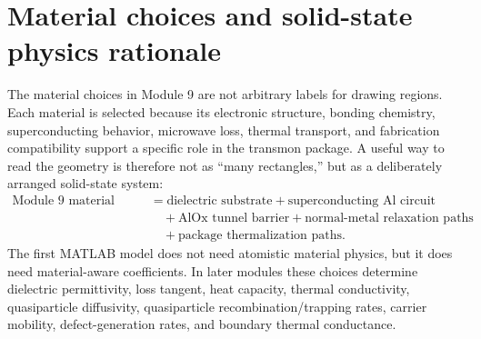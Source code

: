 \documentclass[11pt]{article}
\begin{document}
\section{Material choices and solid-state physics rationale}
The material choices in Module 9 are not arbitrary labels for drawing regions. Each material is selected because its electronic structure, bonding chemistry, superconducting behavior, microwave loss, thermal transport, and fabrication compatibility support a specific role in the transmon package. A useful way to read the geometry is therefore not as ``many rectangles,'' but as a deliberately arranged solid-state system:
\begin{equation}
\begin{aligned}
\text{Module 9 material stack}
&= \text{dielectric substrate}
 + \text{superconducting Al circuit} \\
&\quad + \text{AlOx tunnel barrier}
 + \text{normal-metal relaxation paths} \\
&\quad + \text{package thermalization paths}.
\end{aligned}
\end{equation}
The first MATLAB model does not need atomistic material physics, but it does need material-aware coefficients. In later modules these choices determine dielectric permittivity, loss tangent, heat capacity, thermal conductivity, quasiparticle diffusivity, quasiparticle recombination/trapping rates, carrier mobility, defect-generation rates, and boundary thermal conductance.
\end{document}
